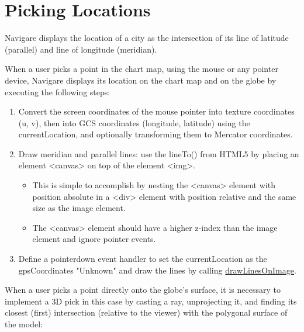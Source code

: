 \documentclass[onecolumn,3p]{elsarticle}
\begin{document}
\section{Picking Locations}

Navigare displays the location of a city as the intersection of its line of latitude (parallel) and line of longitude (meridian).

When a user picks a point in the chart map, using the mouse or any pointer device, Navigare displays its location on the chart map
and on the globe by executing the following steps:
\begin{enumerate}
    \item  Convert the screen coordinates of the mouse pointer into texture coordinates
    (u, v), then into GCS coordinates (longitude, latitude) using the currentLocation, and optionally transforming them to Mercator coordinates.
    \item  Draw meridian and parallel lines: use the lineTo() from HTML5 by placing an element <canvas> on top of the element <img>.
    \begin{itemize}
        \item This is simple to accomplish by nesting the <canvas> element with position
        absolute in a <div> element with position relative and the same size as the image element.
        \item The <canvas> element should have a higher z-index than the image element and ignore pointer events.
    \end{itemize}
    \item  Define a pointerdown event handler to set the currentLocation as the gpsCoordinates "Unknown"
    and draw the lines by calling \href{https://krotalias.github.io/cwdc/13-webgl/extras/doc-light/global.html#drawLinesOnImage}{drawLinesOnImage}.
\end{enumerate}
When a user picks a point directly onto the globe's surface, it is necessary to implement a
3D pick in this case by casting a ray, unprojecting it, and finding its closest (first) intersection
(relative to the viewer) with the polygonal surface of the model:
\end{document}
